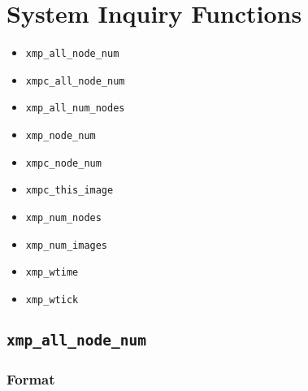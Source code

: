 %
%
%


\section{System Inquiry Functions}
\label{subsec:SystemInquiryFunctions}

\begin{itemize}
 \item {\tt xmp\_all\_node\_num}
 \item {\tt xmpc\_all\_node\_num}
 \item {\tt xmp\_all\_num\_nodes}
 \item {\tt xmp\_node\_num}
 \item {\tt xmpc\_node\_num}
 \item {\tt xmpc\_this\_image}
 \item {\tt xmp\_num\_nodes}
 \item {\tt xmp\_num\_images}
 \item {\tt xmp\_wtime}
 \item {\tt xmp\_wtick}
\end{itemize}

\subsection{\tt xmp\_all\_node\_num}

\subsubsection*{Format}

